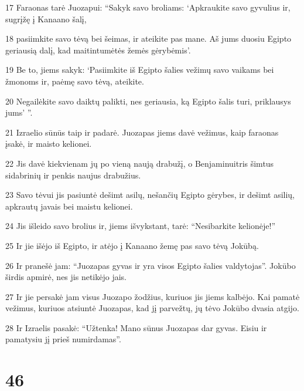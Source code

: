 \par 17 Faraonas tarė Juozapui: “Sakyk savo broliams: ‘Apkraukite savo gyvulius ir, sugrįžę į Kanaano šalį, 
\par 18 pasiimkite savo tėvą bei šeimas, ir ateikite pas mane. Aš jums duosiu Egipto geriausią dalį, kad maitintumėtės žemės gėrybėmis’. 
\par 19 Be to, jiems sakyk: ‘Pasiimkite iš Egipto šalies vežimų savo vaikams bei žmonoms ir, paėmę savo tėvą, ateikite. 
\par 20 Negailėkite savo daiktų palikti, nes geriausia, ką Egipto šalis turi, priklausys jums’ ”. 
\par 21 Izraelio sūnūs taip ir padarė. Juozapas jiems davė vežimus, kaip faraonas įsakė, ir maisto kelionei. 
\par 22 Jis davė kiekvienam jų po vieną naują drabužį, o Benjaminui­tris šimtus sidabrinių ir penkis naujus drabužius. 
\par 23 Savo tėvui jis pasiuntė dešimt asilų, nešančių Egipto gėrybes, ir dešimt asilių, apkrautų javais bei maistu kelionei. 
\par 24 Jis išleido savo brolius ir, jiems išvykstant, tarė: “Nesibarkite kelionėje!” 
\par 25 Ir jie išėjo iš Egipto, ir atėjo į Kanaano žemę pas savo tėvą Jokūbą. 
\par 26 Ir pranešė jam: “Juozapas gyvas ir yra visos Egipto šalies valdytojas”. Jokūbo širdis apmirė, nes jis netikėjo jais. 
\par 27 Ir jie persakė jam visus Juozapo žodžius, kuriuos jis jiems kalbėjo. Kai pamatė vežimus, kuriuos atsiuntė Juozapas, kad jį parvežtų, jų tėvo Jokūbo dvasia atgijo. 
\par 28 Ir Izraelis pasakė: “Užtenka! Mano sūnus Juozapas dar gyvas. Eisiu ir pamatysiu jį prieš numirdamas”.



\chapter{46}

